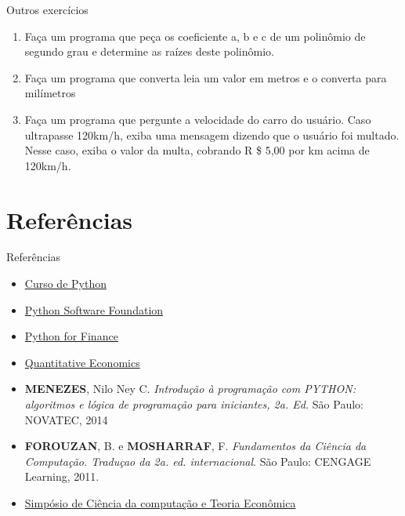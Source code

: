 \documentclass{beamer}
\begin{document}
	
	
	
	
	
	\begin{frame}{Outros exercícios}
		\begin{enumerate}
			\item Faça um programa que peça os coeficiente a, b e c de um polinômio de segundo grau e determine as raízes deste polinômio.
			\item Faça um programa que converta leia um valor em metros e o converta para milímetros
			\item Faça um programa que pergunte a velocidade do carro do usuário.  Caso ultrapasse 120km/h, exiba uma mensagem dizendo que o usuário foi multado.  Nesse caso, exiba o valor da multa, cobrando R \$ 5,00 por km acima de 120km/h.
			
		\end{enumerate}
		
	\end{frame}
	
	\section{Referências}
	\begin{frame}{Referências}
		\begin{itemize}
			\item \href{http://www.cursou.com.br/informatica/curso-de-phyton/}{Curso de Python}
			\item \href{https://www.python.org/}{Python Software Foundation}
			\item \href{https://www.packtpub.com/application-development/python-finance}{Python for Finance}
			\item \href{http://quant-econ.net/}{Quantitative Economics}
			\item \textbf{MENEZES}, Nilo Ney C. \textit{Introdução à programação com PYTHON: algoritmos e lógica de programação para iniciantes, 2a. Ed.}  São Paulo: NOVATEC, 2014
			\item \textbf{FOROUZAN}, B. e \textbf{MOSHARRAF}, F. \textit{Fundamentos da Ciência da Computação. Traduçao da 2a. ed. internacional}. São Paulo: CENGAGE Learning, 2011.
			\item \href{http://www.sciencedirect.com/science/article/pii/S0022053114001616}{Simpósio de Ciência da computação e Teoria Econômica}
		\end{itemize}
	\end{frame}
	
	
	
	
	
\end{document}
